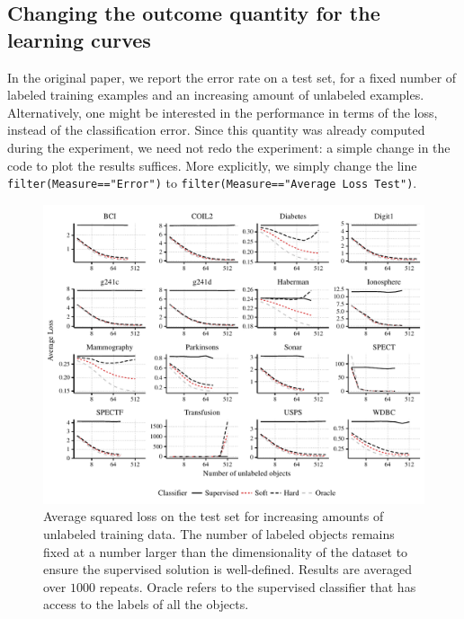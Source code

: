 \documentclass[runningheads,a4paper]{llncs}\usepackage[]{graphicx}\usepackage[]{color}
\makeatletter
\def\maxwidth{ %
  \ifdim\Gin@nat@width>\linewidth
    \linewidth
  \else
    \Gin@nat@width
  \fi
}
\newenvironment{knitrout}{}{} %
\newcommand{\inlinecode}{\texttt}
\makeatother
\begin{document}
\subsection{Changing the outcome quantity for the learning curves}
In the original paper, we report the error rate on a test set, for a fixed number of labeled training examples and an increasing amount of unlabeled examples. Alternatively, one might be interested in the performance in terms of the loss, instead of the classification error. Since this quantity was already computed during the experiment, we need not redo the experiment: a simple change in the code to plot the results suffices. More explicitly, we simply change the line \inlinecode{filter(Measure=="Error")} to \inlinecode{filter(Measure=="Average Loss Test")}.

\begin{knitrout}
\color{fgcolor}\begin{figure}
\includegraphics[width=\maxwidth]{figure/learningcurves-loss-1} \caption[Average squared loss on the test set for increasing amounts of unlabeled training data]{Average squared loss on the test set for increasing amounts of unlabeled training data. The number of labeled objects remains fixed at a number larger than the dimensionality of the dataset to ensure the supervised solution is well-defined. Results are averaged over $1000$ repeats. Oracle refers to the supervised classifier that has access to the labels of all the objects.}\label{fig:learningcurves-loss}
\end{figure}


\end{knitrout}
\end{document}
